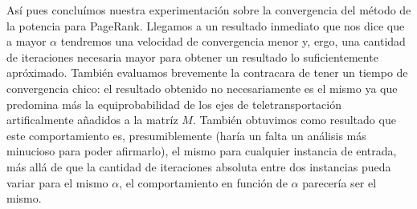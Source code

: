 \medskip
\par As\'i pues conclu\'imos nuestra experimentaci\'on sobre la convergencia del
m\'etodo de la potencia para PageRank. Llegamos a un resultado inmediato que nos
dice que a mayor $\alpha$ tendremos una velocidad de convergencia menor y, ergo,
una cantidad de iteraciones necesaria mayor para obtener un resultado lo
suficientemente apr\'oximado. Tambi\'en evaluamos brevemente la contracara de
tener un tiempo de convergencia chico: el resultado obtenido no necesariamente
es el mismo ya que predomina m\'as la equiprobabilidad de los ejes de
teletransportaci\'on artificalmente a\~nadidos a la matr\'iz $M$. Tambi\'en
obtuvimos como resultado que este comportamiento es, presumiblemente (har\'ia un
falta un an\'alisis m\'as minucioso para poder afirmarlo), el mismo para
cualquier instancia de entrada, m\'as all\'a de que la cantidad de iteraciones
absoluta entre dos instancias pueda variar para el mismo $\alpha$, el
comportamiento en funci\'on de $\alpha$ parecer\'ia ser el mismo.
